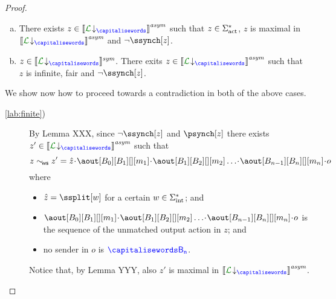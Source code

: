 \begin{proof}
 \begin{enumerate}[a)]
 \item
 \label{lab:finite}
 There exists $z\in \asem{\proj{\clang}{}}$ such that $z\in \Sigma_{\text{act}}^*$, $z$ is maximal in 
 $\asem{\proj{\clang}{}}$ and $\neg\ssynch[z]$.
 \item
  \label{lab:infinite}
   $z\in \ssem{\proj{\clang}{}}$.
 There exits $z\in \asem{\proj{\clang}{}}$ such that $z$ is infinite, fair and $\neg\ssynch[z]$.
 \end{enumerate}
 We show now how to proceed towards a contradiction in both of the above cases.
 \begin{description}
 \item[ \ref{lab:finite})]
 By Lemma XXX, since $\neg\ssynch[z]$ and $\psynch[z]$ there exists 
 $z'\in\asem{\proj{\clang}{}}$ such that 
 $$z\commds z' = \hat z \cat\aout[B_0][B_1][][m_1]\cat\aout[B_1][B_2][][m_2]\ldots\cat\aout[B_{n-1}][B_n][][m_n]\cat o$$
  where
  \begin{itemize}
  \item
 $\hat z = \ssplit[\acword]$ for a certain $w\in\Sigma_{\text{int}}^*$; and 
 \item 
 $\aout[B_0][B_1][][m_1]\cat\aout[B_1][B_2][][m_2]\ldots\cat\aout[B_{n-1}][B_n][][m_n]\cat o$ is the sequence
 of the unmatched 
 output action in $z$; and
 \item
 no sender in $o$ is $\ptp[B_n]$.
 \end{itemize}  
 Notice that, by Lemma YYY, also $z'$ is maximal in $\asem{\proj{\clang}{}}$.\\
%
%

\end{description}
\end{proof}
